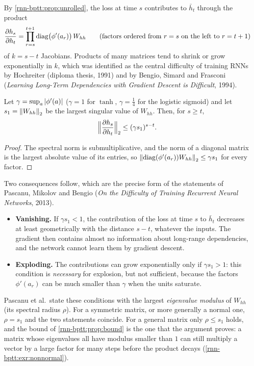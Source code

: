 \begin{notechapter}
By \cref{rnn-bptt:prop:unrolled}, the loss at time $s$ contributes to $\bar h_t$ through the product
\[
  \frac{\partial h_s}{\partial h_t} = \prod_{r=s}^{t+1}\operatorname{diag}\bigl(\phi'(a_r)\bigr)\,W_{hh}\qquad(\text{factors ordered from }r = s\text{ on the left to }r = t+1)
\]
of $k = s - t$ Jacobians. Products of many matrices tend to shrink or grow exponentially in $k$,
which was identified as the central difficulty of training RNNs by Hochreiter (diploma
thesis, 1991) and by Bengio, Simard and Frasconi (\emph{Learning Long-Term Dependencies
with Gradient Descent is Difficult}, 1994).

\begin{proposition}\label{rnn-bptt:prop:bound}
Let $\gamma = \sup_a\left|\phi'(a)\right|$ ($\gamma = 1$ for $\tanh$, $\gamma = \tfrac14$ for the logistic sigmoid) and let $s_1 = \left\|W_{hh}\right\|_2$
be the largest singular value of $W_{hh}$. Then, for $s\geq t$,
\[
  \Bigl\|\frac{\partial h_s}{\partial h_t}\Bigr\|_2\leq(\gamma s_1)^{s-t} .
\]
\end{proposition}

\begin{proof}
The spectral norm is submultiplicative, and the norm of a diagonal matrix is the largest
absolute value of its entries, so $\left\|\operatorname{diag}(\phi'(a_r))W_{hh}\right\|_2\leq\gamma s_1$ for every factor.
\end{proof}

Two consequences follow, which are the precise form of the statements of
Pascanu, Mikolov and Bengio (\emph{On the Difficulty of Training Recurrent Neural Networks}, 2013).
\begin{itemize}
  \item \textbf{Vanishing.} If $\gamma s_1 < 1$, the contribution of the loss at time $s$ to $\bar h_t$ decreases at least
        geometrically with the distance $s - t$, whatever the inputs. The gradient then
        contains almost no information about long-range dependencies, and the network
        cannot learn them by gradient descent.
  \item \textbf{Exploding.} The contributions can grow exponentially only if $\gamma s_1 > 1$: this
        condition is \emph{necessary} for explosion, but not sufficient, because the factors
        $\phi'(a_r)$ can be much smaller than $\gamma$ when the units saturate.
\end{itemize}
Pascanu et al.\ state these conditions with the largest \emph{eigenvalue modulus} of $W_{hh}$ (its
spectral radius $\rho$). For a symmetric matrix, or more generally a normal one, $\rho = s_1$ and the two
statements coincide. For a general matrix only $\rho\leq s_1$ holds, and the bound of
\cref{rnn-bptt:prop:bound} is the one that the argument proves: a matrix whose eigenvalues all
have modulus smaller than $1$ can still multiply a vector by a large factor for many steps
before the product decays (\cref{rnn-bptt:exr:nonnormal}).


\end{notechapter}
